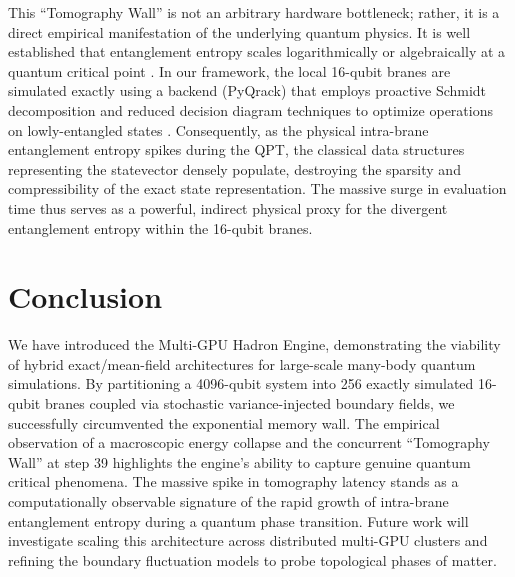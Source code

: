 \documentclass[aps,pra,reprint,superscriptaddress,nofootinbib]{revtex4-2}
\begin{document}
This ``Tomography Wall'' is not an arbitrary hardware bottleneck; rather, it is a direct empirical manifestation of the underlying quantum physics. It is well established that entanglement entropy scales logarithmically or algebraically at a quantum critical point \cite{vidal2003entanglement, amico2008entanglement}. In our framework, the local 16-qubit branes are simulated exactly using a backend (PyQrack) that employs proactive Schmidt decomposition and reduced decision diagram techniques to optimize operations on lowly-entangled states \cite{strano2023exact}. Consequently, as the physical intra-brane entanglement entropy spikes during the QPT, the classical data structures representing the statevector densely populate, destroying the sparsity and compressibility of the exact state representation. The massive surge in evaluation time thus serves as a powerful, indirect physical proxy for the divergent entanglement entropy within the 16-qubit branes.

\section{Conclusion}
We have introduced the Multi-GPU Hadron Engine, demonstrating the viability of hybrid exact/mean-field architectures for large-scale many-body quantum simulations. By partitioning a 4096-qubit system into 256 exactly simulated 16-qubit branes coupled via stochastic variance-injected boundary fields, we successfully circumvented the exponential memory wall. The empirical observation of a macroscopic energy collapse and the concurrent ``Tomography Wall'' at step 39 highlights the engine's ability to capture genuine quantum critical phenomena. The massive spike in tomography latency stands as a computationally observable signature of the rapid growth of intra-brane entanglement entropy during a quantum phase transition. Future work will investigate scaling this architecture across distributed multi-GPU clusters and refining the boundary fluctuation models to probe topological phases of matter.
\end{document}
